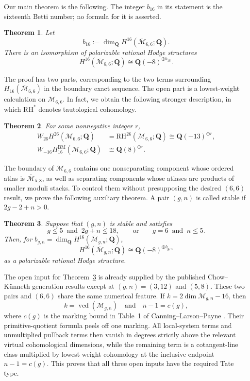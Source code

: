 \documentclass[12pt,reqno]{amsart}
\newcommand{\Q}{\mathbf{Q}}
\newcommand{\M}{\mathcal{M}}
\newcommand{\Mbar}{\overline{\mathcal{M}}}
\newcommand{\BM}{\mathrm{BM}}
\newcommand{\RH}{\mathrm{RH}}
\newcommand{\vcd}{\operatorname{vcd}}
\newtheorem{theorem}{Theorem}[section]
\theoremstyle{definition}
\theoremstyle{remark}
\begin{document}
Our main theorem is the following.  The integer $b_{16}$ in its statement is
the sixteenth Betti number; no formula for it is asserted.

\begin{theorem}\label{thm:main}
Let
\[
  b_{16}:=\dim_{\Q}H^{16}(\Mbar_{6,6};\Q).
\]
There is an isomorphism of polarizable rational Hodge structures
\[
  H^{16}(\Mbar_{6,6};\Q)
  \cong \Q(-8)^{\oplus b_{16}}.
\]
\end{theorem}

The proof has two parts, corresponding to the two terms surrounding
$H_{16}(\Mbar_{6,6})$ in the boundary exact sequence.  The open part is a
lowest-weight calculation on $\M_{6,6}$.  In fact, we obtain the following
stronger description, in which $\RH^*$ denotes tautological cohomology.

\begin{theorem}\label{thm:open-intro}
For some nonnegative integer $r$,
\begin{align*}
 W_{26}H^{26}(\M_{6,6};\Q)
   &=\RH^{26}(\M_{6,6};\Q)
     \cong\Q(-13)^{\oplus r},\\
 W_{-16}H^{\BM}_{16}(\M_{6,6};\Q)
   &\cong\Q(8)^{\oplus r}.
\end{align*}
\end{theorem}

The boundary of $\Mbar_{6,6}$ contains one nonseparating component whose
ordered atlas is $\Mbar_{5,8}$, as well as separating components whose atlases
are products of smaller moduli stacks.  To control them without presupposing
the desired $(6,6)$ result, we prove the following auxiliary theorem.  A pair
$(g,n)$ is called stable if $2g-2+n>0$.

\begin{theorem}\label{thm:range-intro}
Suppose that $(g,n)$ is stable and satisfies
\begin{equation}\label{eq:range-intro}
  g\leq5\ \text{ and }\ 2g+n\leq18,
  \qquad\text{or}\qquad
  g=6\ \text{ and }\ n\leq5.
\end{equation}
Then, for $b_{g,n}=\dim_{\Q}H^{16}(\Mbar_{g,n};\Q)$,
\[
  H^{16}(\Mbar_{g,n};\Q)
  \cong\Q(-8)^{\oplus b_{g,n}}
\]
as a polarizable rational Hodge structure.
\end{theorem}

The open input for Theorem~\ref{thm:range-intro} is already supplied by the
published Chow--K\"unneth generation results except at $(g,n)=(3,12)$ and
$(5,8)$.  These two pairs and $(6,6)$ share the same numerical feature.  If
$k=2\dim\M_{g,n}-16$, then
\[
  k=\vcd(\M_{g,n})
  \quad\text{and}\quad n-1=c(g),
\]
where $c(g)$ is the marking bound in Table~1 of
Canning--Larson--Payne \cite{CLP}.  Their primitive-quotient formula peels
off one marking.  All local-system terms and unmultiplied pullback terms then
vanish in degrees strictly above the relevant virtual cohomological
dimensions, while the remaining term is a cotangent-line class multiplied by
lowest-weight cohomology at the inclusive endpoint $n-1=c(g)$.  This proves
that all three open inputs have the required Tate type.
\end{document}
